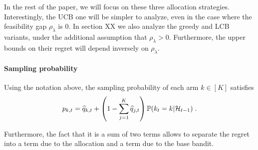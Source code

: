 In the rest of the paper, we will focus on these three allocation strategies. Interestingly, the UCB one will be simpler to analyze, even in the case where the feasibility gap $\rho_\lambda$ is $0$. In section XX we also analyze the greedy and LCB variants, under the additional assumption that $\rho_\lambda>0$. Furthermore, the upper bounds on their regret will depend inversely on $\rho_\lambda$.


\paragraph{Sampling probability} Using the notation above, the sampling probability of each arm $k \in [K]$ satisfies 
\begin{equation}\label{eq::sampling_prob} p_{k,t} = \widehat{q}_{k, t} + \left(1-\sum_{j=1}^K \widehat{q}_{j, t}\right) \mathbb{P}(k_t=k | \mathcal{H}_{t-1}) \;. \end{equation}

Furthermore, the fact that it is a sum of two terms allows to separate the regret into a term due to the allocation and a term due to the base bandit.  